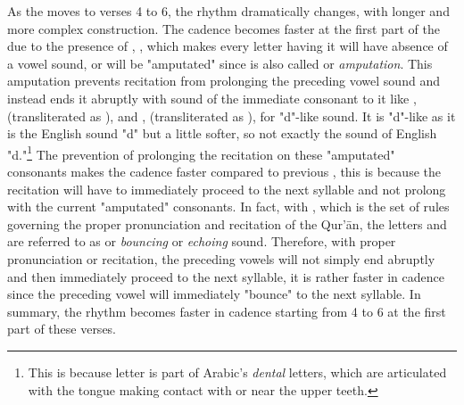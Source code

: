 As the   moves to verses 4 to 6, the rhythm dramatically changes, with longer and more complex construction. The cadence becomes faster at the first part of the   due to the presence of  , , which makes every letter having it will have absence of a vowel sound, or will be "amputated" since   is also called   or \textit{amputation}. This amputation prevents recitation from prolonging the preceding vowel sound and instead ends it abruptly with sound of the immediate consonant to it like  ,  (transliterated as ), and  ,  (transliterated as ), for "d"-like sound. It is "d"-like as it is the English sound "d" but a little softer, so not exactly the sound of English "d."\footnote{This is because   letter is part of Arabic's \textit{dental} letters, which are articulated with the tongue making contact with or near the upper teeth.} The prevention of prolonging the recitation on these "amputated" consonants makes the cadence faster compared to previous  , this is because the recitation will have to immediately proceed to the next syllable and not prolong with the current "amputated" consonants. In fact, with  , which is the set of rules governing the proper pronunciation and recitation of the Qur'\=an, the letters    and    are referred to as   or \textit{bouncing} or \textit{echoing} sound. Therefore, with proper pronunciation or recitation, the preceding vowels will not simply end abruptly and then immediately proceed to the next syllable, it is rather faster in cadence since the preceding vowel will immediately "bounce" to the next syllable. In summary, the rhythm becomes faster in cadence starting from   4 to 6 at the first part of these verses. 

